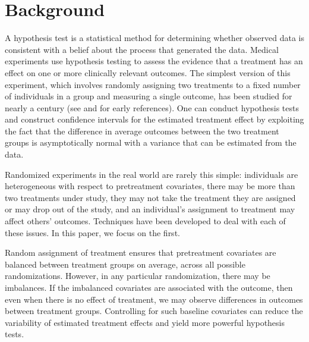 \documentclass[11pt]{article}
\newcommand{\todo}[1]{{\color{red}{TO DO: \sc #1}}}
\begin{document}
%
%


\section*{Background}
A hypothesis test is a statistical method for determining whether observed data is consistent with a belief about the process that generated the data.
Medical experiments use hypothesis testing to assess the evidence that a treatment has an effect on one or more clinically relevant outcomes.
The simplest version of this experiment, which involves randomly assigning two treatments to a fixed number of individuals in a group and measuring a single outcome, has been studied for nearly a century (see \cite{fisher_design_1935} and \cite{neyman_application_1923} for early references).
One can conduct hypothesis tests and construct confidence intervals for the estimated treatment effect
by exploiting the fact that the difference in average outcomes between the two treatment groups is asymptotically normal with a variance that can be estimated from the data.

Randomized experiments in the real world are rarely this simple:
individuals are heterogeneous with respect to pretreatment covariates,
there may be more than two treatments under study,
they may not take the treatment they are assigned or may drop out of the study,
and an individual's assignment to treatment may affect others' outcomes.
Techniques have been developed to deal with each of these issues.
In this paper, we focus on the first.

Random assignment of treatment ensures that pretreatment covariates are balanced between treatment groups on average, across all possible randomizations.
However, in any particular randomization, there may be imbalances.
If the imbalanced covariates are associated with the outcome, then even when there is no effect of treatment, we may observe differences in outcomes between treatment groups.
Controlling for such baseline covariates can reduce the variability of estimated treatment effects and yield more powerful hypothesis tests. \todo{cite}
\end{document}
